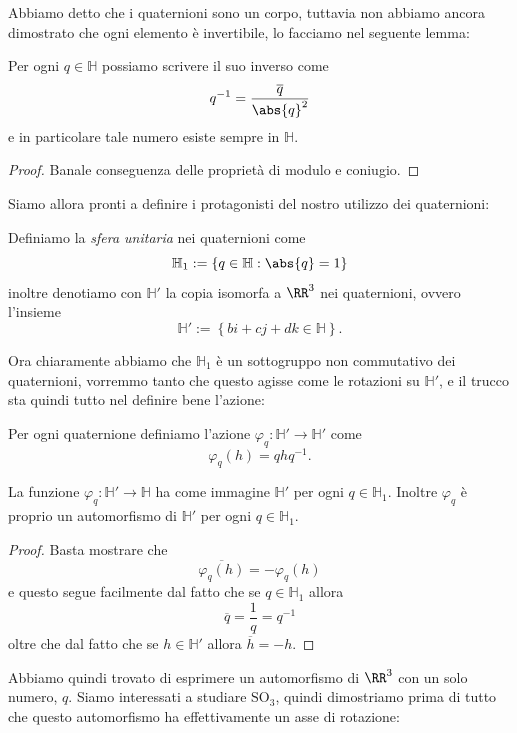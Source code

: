 \documentclass[11pt]{scrartcl}
\newcommand{\SO}{\text{SO}}
\begin{document}
   	 Abbiamo detto che i quaternioni sono un corpo, tuttavia non abbiamo ancora dimostrato che ogni elemento è invertibile, lo facciamo nel seguente lemma:
   	 \begin{corollary}
   	 	Per ogni $q\in \mathbb{H}$ possiamo scrivere il suo inverso come
   	 	$$q^{-1}=\frac{\overline{q}}{\abs{q}^2}$$
   	 	e in particolare tale numero esiste sempre in $\mathbb{H}$.
   	 \end{corollary}
   	 \begin{proof}
   	 	Banale conseguenza delle proprietà di modulo e coniugio.
   	 \end{proof}
   	 Siamo allora pronti a definire i protagonisti del nostro utilizzo dei quaternioni:
   	 \begin{definition}
   	 	Definiamo la \textit{sfera unitaria} nei quaternioni come
   	 	$$\mathbb{H}_1:=\left\{q\in \mathbb{H}:\abs{q}=1\right\}$$
   	 	inoltre denotiamo con $\mathbb{H}'$ la copia isomorfa a $\RR^3$ nei quaternioni, ovvero l'insieme
   	 	$$\mathbb{H}':=\left\{bi+cj+dk\in \mathbb{H}\right\}.$$
   	 \end{definition}
   	 Ora chiaramente abbiamo che $\mathbb{H}_1$ è un sottogruppo non commutativo dei quaternioni, vorremmo tanto che questo agisse come le rotazioni su $\mathbb{H}'$, e il trucco sta quindi tutto nel definire bene l'azione:
   	 \begin{definition}
   	 	Per ogni quaternione definiamo l'azione $\varphi_q:\mathbb{H}'\to \mathbb{H}'$ come
   	 	$$\varphi_q(h)=qhq^{-1}.$$
   	 \end{definition}
   	 \begin{lemma}
   	 	La funzione $\varphi_q:\mathbb{H}'\to \mathbb{H}$ ha come immagine $\mathbb{H}'$ per ogni $q\in \mathbb{H}_1$. Inoltre $\varphi_q$ è proprio un automorfismo di $\mathbb{H}'$ per ogni $q\in \mathbb{H}_1$.
   	 \end{lemma}
   	 \begin{proof}
   	 	Basta mostrare che $$\overline{\varphi_q(h)}=-\varphi_q(h)$$
   	 	e questo segue facilmente dal fatto che se $q\in \mathbb{H}_1$ allora 
   	 	$$\overline{q}=\frac{1}{q}=q^{-1}$$
   	 	oltre che dal fatto che se $h\in \mathbb{H}'$ allora $\overline{h}=-h$.
   	 \end{proof}
   	 Abbiamo quindi trovato di esprimere un automorfismo di $\RR^3$ con un solo numero, $q$. Siamo interessati a studiare $\SO_3$, quindi dimostriamo prima di tutto che questo automorfismo ha effettivamente un asse di rotazione:
\end{document}
